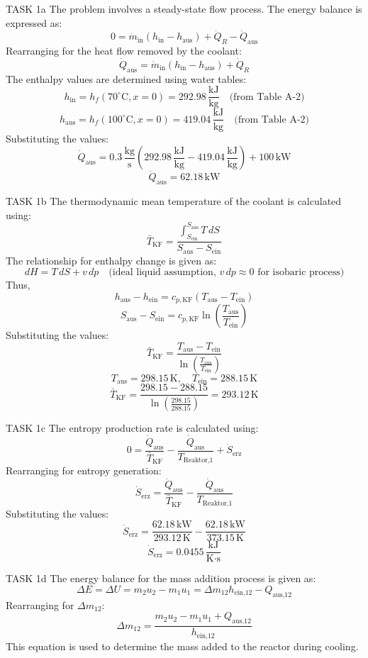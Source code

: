 TASK 1a  
The problem involves a steady-state flow process. The energy balance is expressed as:  
\[
0 = \dot{m}_{\text{in}} (h_{\text{in}} - h_{\text{aus}}) + \dot{Q}_R - \dot{Q}_{\text{aus}}
\]  
Rearranging for the heat flow removed by the coolant:  
\[
\dot{Q}_{\text{aus}} = \dot{m}_{\text{in}} (h_{\text{in}} - h_{\text{aus}}) + \dot{Q}_R
\]  
The enthalpy values are determined using water tables:  
\[
h_{\text{in}} = h_f(70^\circ\text{C}, x = 0) = 292.98 \, \frac{\text{kJ}}{\text{kg}} \quad \text{(from Table A-2)}
\]  
\[
h_{\text{aus}} = h_f(100^\circ\text{C}, x = 0) = 419.04 \, \frac{\text{kJ}}{\text{kg}} \quad \text{(from Table A-2)}
\]  
Substituting the values:  
\[
\dot{Q}_{\text{aus}} = 0.3 \, \frac{\text{kg}}{\text{s}} \left(292.98 \, \frac{\text{kJ}}{\text{kg}} - 419.04 \, \frac{\text{kJ}}{\text{kg}}\right) + 100 \, \text{kW}
\]  
\[
\dot{Q}_{\text{aus}} = 62.18 \, \text{kW}
\]  

TASK 1b  
The thermodynamic mean temperature of the coolant is calculated using:  
\[
\bar{T}_{\text{KF}} = \frac{\int_{S_{\text{ein}}}^{S_{\text{aus}}} T \, dS}{S_{\text{aus}} - S_{\text{ein}}}
\]  
The relationship for enthalpy change is given as:  
\[
dH = T \, dS + v \, dp \quad \text{(ideal liquid assumption, } v \, dp \approx 0 \text{ for isobaric process)}
\]  
Thus,  
\[
h_{\text{aus}} - h_{\text{ein}} = c_{p,\text{KF}} (T_{\text{aus}} - T_{\text{ein}})
\]  
\[
S_{\text{aus}} - S_{\text{ein}} = c_{p,\text{KF}} \ln \left(\frac{T_{\text{aus}}}{T_{\text{ein}}}\right)
\]  
Substituting the values:  
\[
\bar{T}_{\text{KF}} = \frac{T_{\text{aus}} - T_{\text{ein}}}{\ln \left(\frac{T_{\text{aus}}}{T_{\text{ein}}}\right)}
\]  
\[
T_{\text{aus}} = 298.15 \, \text{K}, \quad T_{\text{ein}} = 288.15 \, \text{K}
\]  
\[
\bar{T}_{\text{KF}} = \frac{298.15 - 288.15}{\ln \left(\frac{298.15}{288.15}\right)} = 293.12 \, \text{K}
\]  

TASK 1c  
The entropy production rate is calculated using:  
\[
0 = \frac{\dot{Q}_{\text{aus}}}{\bar{T}_{\text{KF}}} - \frac{\dot{Q}_{\text{aus}}}{T_{\text{Reaktor,1}}} + \dot{S}_{\text{erz}}
\]  
Rearranging for entropy generation:  
\[
\dot{S}_{\text{erz}} = \frac{\dot{Q}_{\text{aus}}}{\bar{T}_{\text{KF}}} - \frac{\dot{Q}_{\text{aus}}}{T_{\text{Reaktor,1}}}
\]  
Substituting the values:  
\[
\dot{S}_{\text{erz}} = \frac{62.18 \, \text{kW}}{293.12 \, \text{K}} - \frac{62.18 \, \text{kW}}{373.15 \, \text{K}}
\]  
\[
\dot{S}_{\text{erz}} = 0.0455 \, \frac{\text{kJ}}{\text{K·s}}
\]  

TASK 1d  
The energy balance for the mass addition process is given as:  
\[
\Delta E = \Delta U = m_2 u_2 - m_1 u_1 = \Delta m_{12} h_{\text{ein,12}} - Q_{\text{aus,12}}
\]  
Rearranging for \( \Delta m_{12} \):  
\[
\Delta m_{12} = \frac{m_2 u_2 - m_1 u_1 + Q_{\text{aus,12}}}{h_{\text{ein,12}}}
\]  
This equation is used to determine the mass added to the reactor during cooling.